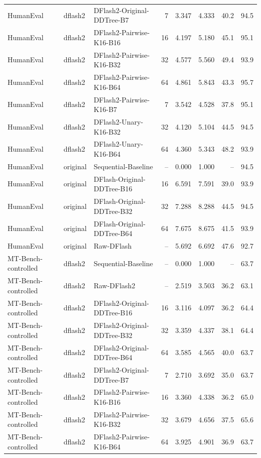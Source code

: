 \begin{longtable}{lllrrrrr}
HumanEval & dflash2 & DFlash2-Original-DDTree-B7 & 7 & 3.347 & 4.333 & 40.2 & 94.5 \\
HumanEval & dflash2 & DFlash2-Pairwise-K16-B16 & 16 & 4.197 & 5.180 & 45.1 & 95.1 \\
HumanEval & dflash2 & DFlash2-Pairwise-K16-B32 & 32 & 4.577 & 5.560 & 49.4 & 93.9 \\
HumanEval & dflash2 & DFlash2-Pairwise-K16-B64 & 64 & 4.861 & 5.843 & 43.3 & 95.7 \\
HumanEval & dflash2 & DFlash2-Pairwise-K16-B7 & 7 & 3.542 & 4.528 & 37.8 & 95.1 \\
HumanEval & dflash2 & DFlash2-Unary-K16-B32 & 32 & 4.120 & 5.104 & 44.5 & 94.5 \\
HumanEval & dflash2 & DFlash2-Unary-K16-B64 & 64 & 4.360 & 5.343 & 48.2 & 93.9 \\
HumanEval & original & Sequential-Baseline & -- & 0.000 & 1.000 & -- & 94.5 \\
HumanEval & original & DFlash-Original-DDTree-B16 & 16 & 6.591 & 7.591 & 39.0 & 93.9 \\
HumanEval & original & DFlash-Original-DDTree-B32 & 32 & 7.288 & 8.288 & 44.5 & 94.5 \\
HumanEval & original & DFlash-Original-DDTree-B64 & 64 & 7.675 & 8.675 & 41.5 & 93.9 \\
HumanEval & original & Raw-DFlash & -- & 5.692 & 6.692 & 47.6 & 92.7 \\
MT-Bench-controlled & dflash2 & Sequential-Baseline & -- & 0.000 & 1.000 & -- & 63.7 \\
MT-Bench-controlled & dflash2 & Raw-DFlash2 & -- & 2.519 & 3.503 & 36.2 & 63.1 \\
MT-Bench-controlled & dflash2 & DFlash2-Original-DDTree-B16 & 16 & 3.116 & 4.097 & 36.2 & 64.4 \\
MT-Bench-controlled & dflash2 & DFlash2-Original-DDTree-B32 & 32 & 3.359 & 4.337 & 38.1 & 64.4 \\
MT-Bench-controlled & dflash2 & DFlash2-Original-DDTree-B64 & 64 & 3.585 & 4.565 & 40.0 & 63.7 \\
MT-Bench-controlled & dflash2 & DFlash2-Original-DDTree-B7 & 7 & 2.710 & 3.692 & 35.0 & 63.7 \\
MT-Bench-controlled & dflash2 & DFlash2-Pairwise-K16-B16 & 16 & 3.360 & 4.338 & 36.2 & 65.0 \\
MT-Bench-controlled & dflash2 & DFlash2-Pairwise-K16-B32 & 32 & 3.679 & 4.656 & 37.5 & 65.6 \\
MT-Bench-controlled & dflash2 & DFlash2-Pairwise-K16-B64 & 64 & 3.925 & 4.901 & 36.9 & 63.7 \\

\end{longtable}
